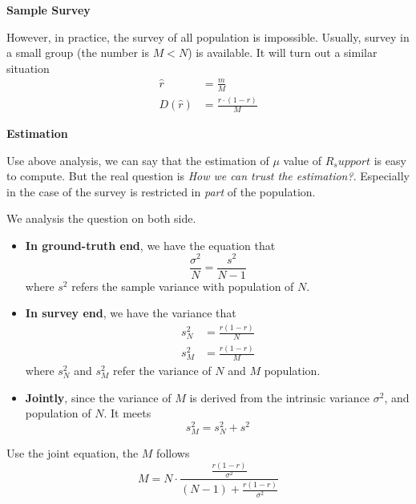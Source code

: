 \documentclass[../main.tex]{subfiles}
\begin{document}
\bigbreak
\textbf{Sample Survey}

However, in practice, the survey of all population is impossible.
Usually, survey in a small group (the number is $M < N$) is available.
It will turn out a similar situation
\begin{align}
    \hat{r}    & = \frac{m}{M}             \\
    D(\hat{r}) & = \frac{r \cdot (1-r)}{M}
\end{align}

\bigbreak
\textbf{Estimation}

Use above analysis, we can say that the estimation of $\mu$ value of $R_support$ is easy to compute.
But the real question is \emph{How we can trust the estimation?}.
Especially in the case of the survey is restricted in \emph{part} of the population.

We analysis the question on both side.

\begin{itemize}
    \item \textbf{In ground-truth end}, we have the equation that
          \begin{equation*}
              \frac{\sigma^2}{N} = \frac{s^2}{N-1}
          \end{equation*}
          where $s^2$ refers the sample variance with population of $N$.
    \item \textbf{In survey end}, we have the variance that
          \begin{align*}
              s_{N}^2 & = \frac{r(1-r)}{N} \\
              s_{M}^2 & = \frac{r(1-r)}{M}
          \end{align*}
          where $s_N^2$ and $s_M^2$ refer the variance of $N$ and $M$ population.

    \item \textbf{Jointly}, since the variance of $M$ is derived from the intrinsic variance $\sigma^2$, and population of $N$.
          It meets
          \begin{equation*}
              s_M^2 = s_N^2 + s^2
          \end{equation*}

\end{itemize}

Use the joint equation, the $M$ follows
\begin{equation*}
    M = N \cdot \frac{\frac{r(1-r)}{\sigma^2}}{(N-1)+\frac{r(1-r)}{\sigma^2}}
\end{equation*}
\end{document}
